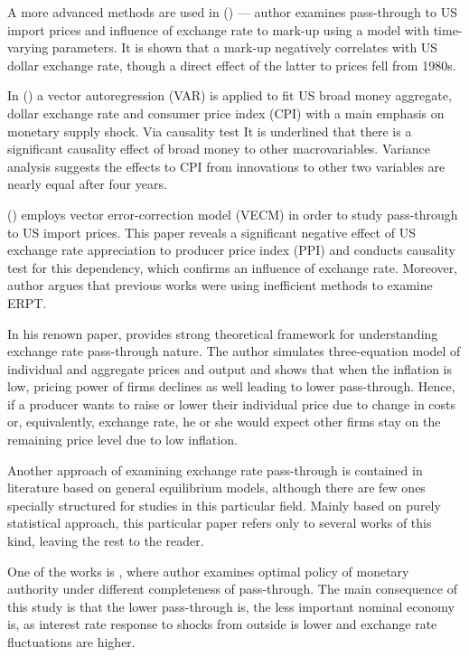 \documentclass[12pt, a4paper]{extarticle}
\begin{document}
A more advanced methods are used in (\cite{Kim1990}) --- author examines pass-through to US import prices and influence of exchange rate to mark-up using a model with time-varying parameters. It is shown that a mark-up negatively correlates with US dollar exchange rate, though a direct effect of the latter to prices fell from 1980s. 

In (\cite{Deravi1995}) a vector autoregression (VAR) is applied to fit US broad money aggregate, dollar exchange rate and consumer price index (CPI) with a main emphasis on monetary supply shock. Via causality test It is underlined that there is a significant causality effect of broad money to other macrovariables. Variance analysis suggests the effects to CPI from innovations to other two variables are nearly equal after four years.
 
(\cite{Kim1998}) employs vector error-correction model (VECM) in order to study pass-through to US import prices. This paper reveals a significant negative effect of US exchange rate appreciation to producer price index (PPI) and conducts causality test for this dependency, which confirms an influence of exchange rate. Moreover, author argues that previous works were using inefficient methods to examine ERPT. 

In his renown paper, \textcite{Taylor2000} provides strong theoretical framework for understanding exchange rate pass-through nature. The author simulates three-equation model of individual and aggregate prices and output and shows that when the inflation is low, pricing power of firms declines as well leading to lower pass-through. Hence, if a producer wants to raise or lower their individual price due to change in costs or, equivalently, exchange rate, he or she would expect other firms stay on the remaining price level due to low inflation.
 
Another approach of examining exchange rate pass-through is contained in literature based on general equilibrium models, although there are few ones specially structured for studies in this particular field. Mainly based on purely statistical approach, this particular paper refers only to several works of this kind, leaving the rest to the reader.

One of the works is \cite{Adolfson2001}, where author examines optimal policy of monetary authority under different completeness of pass-through. The main consequence of this study is that the lower pass-through is, the less important nominal economy is, as interest rate response to shocks from outside is lower and exchange rate fluctuations are higher.
\end{document}
